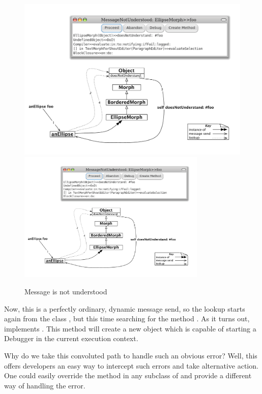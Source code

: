 \documentclass[a4paper,10pt,twoside]{book}
\begin{document}
\begin{figure}[htb]
\begin{center}
\ifluluelse
	{\includegraphics[width=\textwidth]{fooNotFound}}
	{\includegraphics[width=0.8\textwidth]{fooNotFound}}
\caption{Message  is not understood}
\end{center}
\end{figure}

Now, this is a perfectly ordinary, dynamic message send, so the lookup starts again from the class , but this time searching for the method .
As it turns out,  implements .
This method will create a new  object which is capable of starting a Debugger in the current execution context.

Why do we take this convoluted path to handle such an obvious error?
Well, this offers developers an easy way to intercept such errors and take alternative action.
One could easily override the method  in any subclass of  and  provide a different way of handling the error.
\end{document}
